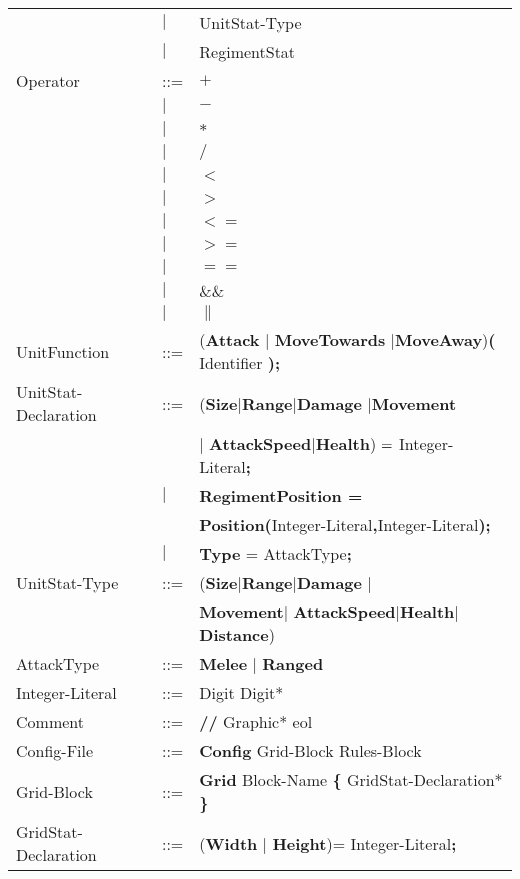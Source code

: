 \begin{center}
\begin{longtable}{ l l p{7cm} }
								&$\mid$	&UnitStat-Type\\
								&$\mid$	&RegimentStat \\	
	Operator					&	::=	&$\boldsymbol {+}$\\
								&$\mid$	&$\boldsymbol {-}$\\
								&$\mid$	&$\boldsymbol {*}$\\
								&$\mid$	&$\boldsymbol {/}$\\
								&$\mid$	&$\boldsymbol {<}$\\
								&$\mid$	&$\boldsymbol {>}$\\
								&$\mid$	&$\boldsymbol {<=}$\\
								&$\mid$	&$\boldsymbol {>=}$\\
								&$\mid$	&$\boldsymbol {==}$\\
								&$\mid$	&$\boldsymbol {\&\&}$\\
								&$\mid$	&$\boldsymbol {\|}$\\
	UnitFunction				&	::=	&({\bf Attack} $\mid$ {\bf MoveTowards} $\mid${\bf MoveAway}){\bf (} Identifier {\bf );}\\
	UnitStat-Declaration		&	::=	&({\bf Size}$\mid${\bf Range}$\mid${\bf Damage} $\mid${\bf Movement}\\ 
								&		&$\mid$ {\bf AttackSpeed}$\mid${\bf Health}) ${\bf = }$ Integer-Literal{\bf ;} \\
								&$\mid$	&{\bf RegimentPosition =} \\
								&		&{\bf Position(}Integer-Literal{\bf ,}Integer-Literal{\bf );}\\
								&$\mid$	&{\bf Type} = AttackType{\bf ;}\\
	UnitStat-Type				&	::=	&({\bf Size}$\mid${\bf Range}$\mid${\bf Damage} $\mid$\\
								&		&{\bf Movement}$\mid$ {\bf AttackSpeed}$\mid${\bf Health}$\mid${\bf Distance})\\ 
	AttackType					&	::=	&{\bf Melee} $\mid$ {\bf Ranged} \\
	Integer-Literal				&	::=	&Digit Digit*\\
	Comment						&	::=	&{\bf //} Graphic* eol\\
	Config-File					&	::=	&{\bf Config} Grid-Block Rules-Block  		\\
	Grid-Block					&	::=	&{\bf Grid} Block-Name	 {\bf \{} GridStat-Declaration* \bf{\}} \\
	GridStat-Declaration		&	::=	&({\bf Width} $\mid$ {\bf Height})=  Integer-Literal{\bf ;} \\	

\end{longtable}
\end{center}
